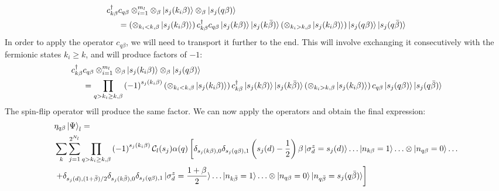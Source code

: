 \documentclass[prb]{revtex4-2}
\begin{document}
\begin{equation}\begin{aligned}
	c^\dagger_{k \beta}&c_{q \beta}\otimes_{i=1}^{m_l}\otimes_{\beta}\ket{s_j(k_i\beta) }\otimes_{\beta}\ket{s_j(q\beta)} \\
	&= \left(\otimes_{k_i < k,\beta}\ket{s_j(k_i\beta) }\right)c^\dagger_{k \beta}c_{q \beta}\ket{s_j(k \beta) }\ket{s_j(k \bar\beta) }\left(\otimes_{k_i > k,\beta}\ket{s_j(k_i\beta) }\right)\ket{s_j(q\beta)}\ket{s_j(q\bar\beta)}
\end{aligned}\end{equation}
In order to apply the operator \(c_{q\beta}\), we will need to transport it further to the end. This will involve exchanging it consecutively with the fermionic states \(k_i \geq k\), and will produce factors of \(-1\):
\begin{equation}\begin{aligned}
	c^\dagger_{k \beta}&c_{q \beta}\otimes_{i=1}^{m_l}\otimes_{\beta}\ket{s_j(k_i\beta) }\otimes_{\beta}\ket{s_j(q\beta)} \\
			   &= \prod_{q > k_i \geq k,\beta}\left( -1 \right)^{s_j(k_i\beta)} \left(\otimes_{k_i < k,\beta}\ket{s_j(k_i\beta) }\right)c^\dagger_{k \beta}\ket{s_j(k \beta) }\ket{s_j(k \bar\beta) }\left(\otimes_{k_i > k,\beta}\ket{s_j(k_i\beta) }\right)c_{q \beta}\ket{s_j(q\beta)}\ket{s_j(q\bar\beta)}\\
\end{aligned}\end{equation}
The spin-flip operator will produce the same factor. We can now apply the operators and obtain the final expression:
\begin{equation}\begin{aligned}
	&\eta_{q\beta} \ket{\Psi}_l = \\
	&\sum_{k} \sum_{j=1}^{2^{N_l}} \prod_{q > k_i \geq k,\beta}\left( -1 \right)^{s_j(k_i\beta)}\mathcal{C}_l(s_j) \alpha(q)\left[ \delta_{s_j(k\beta),0}\delta_{s_j(q\beta),1} \left(s_j(d) - \frac{1}{2}\right)\beta \ket{\sigma^z_d=s_j(d)}\ldots \ket{n_{k\beta}=1 }\ldots \otimes\ket{n_{q\beta}=0}\ldots \right.\\
	&\left.+ \delta_{s_j(d),(1 + \bar\beta)/2}\delta_{s_j(k\bar\beta),0}\delta_{s_j(q\beta),1} \ket{\sigma^z_d=\frac{1 + \beta}{2}}\ldots \ket{n_{k\bar\beta}=1 }\ldots \otimes\ket{n_{q\beta}=0}\ket{n_{q\bar\beta}=s_j(q\bar\beta)}\right]
\end{aligned}\end{equation}
\end{document}
